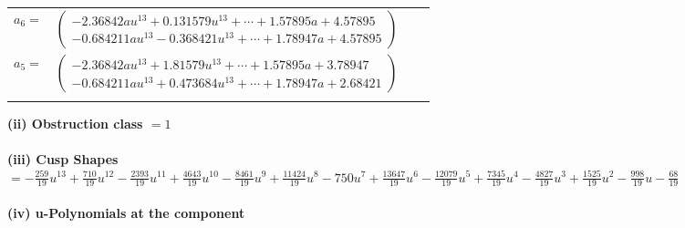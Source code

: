\documentclass[1p]{elsarticle_modified}
\theoremstyle{definition}
\begin{document}
\begin{tabular}{m{7pt} m{180pt} m{7pt} m{180pt} }
\flushright $a_{6}=$&$\begin{pmatrix}-2.36842 a u^{13}+0.131579 u^{13}+\cdots+1.57895 a+4.57895\\-0.684211 a u^{13}-0.368421 u^{13}+\cdots+1.78947 a+4.57895\end{pmatrix}$ \\
\flushright $a_{5}=$&$\begin{pmatrix}-2.36842 a u^{13}+1.81579 u^{13}+\cdots+1.57895 a+3.78947\\-0.684211 a u^{13}+0.473684 u^{13}+\cdots+1.78947 a+2.68421\end{pmatrix}$\\&\end{tabular}
\flushleft \textbf{(ii) Obstruction class $= 1$}\\~\\
\flushleft \textbf{(iii) Cusp Shapes $= -\frac{259}{19} u^{13}+\frac{710}{19} u^{12}-\frac{2393}{19} u^{11}+\frac{4643}{19} u^{10}-\frac{8461}{19} u^9+\frac{11424}{19} u^8-750 u^7+\frac{13647}{19} u^6-\frac{12079}{19} u^5+\frac{7345}{19} u^4-\frac{4827}{19} u^3+\frac{1525}{19} u^2-\frac{998}{19} u-\frac{68}{19}$}\\~\\
\newpage\renewcommand{\arraystretch}{1}
\flushleft \textbf{(iv) u-Polynomials at the component}\newline \\
\end{document}
